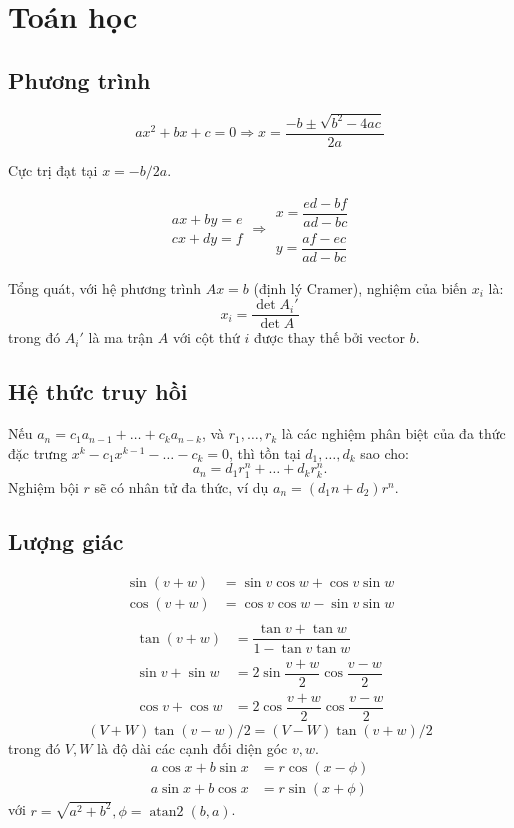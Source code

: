 
\chapter{Toán học}

\section{Phương trình}
\[ax^2+bx+c=0 \Rightarrow x = \frac{-b\pm\sqrt{b^2-4ac}}{2a}\]

Cực trị đạt tại $x = -b/2a$.

\[\begin{aligned}ax+by=e\\cx+dy=f\end{aligned}
\Rightarrow
\begin{aligned}x=\dfrac{ed-bf}{ad-bc}\\y=\dfrac{af-ec}{ad-bc}\end{aligned}\]

Tổng quát, với hệ phương trình $Ax = b$ (định lý Cramer), nghiệm của biến $x_i$ là:
\[x_i = \frac{\det A_i'}{\det A} \]
trong đó $A_i'$ là ma trận $A$ với cột thứ $i$ được thay thế bởi vector $b$.

\section{Hệ thức truy hồi}
Nếu $a_n = c_1 a_{n-1} + \dots + c_k a_{n-k}$, và $r_1, \dots, r_k$ là các nghiệm phân biệt của đa thức đặc trưng $x^k - c_1 x^{k-1} - \dots - c_k = 0$, thì tồn tại $d_1, \dots, d_k$ sao cho:
\[a_n = d_1r_1^n + \dots + d_kr_k^n. \]
Nghiệm bội $r$ sẽ có nhân tử đa thức, ví dụ $a_n = (d_1n + d_2)r^n$.

\section{Lượng giác}
\begin{align*}
\sin(v+w)&{}=\sin v\cos w+\cos v\sin w\\
\cos(v+w)&{}=\cos v\cos w-\sin v\sin w\\
\end{align*}
\begin{align*}
\tan(v+w)&{}=\dfrac{\tan v+\tan w}{1-\tan v\tan w}\\
\sin v+\sin w&{}=2\sin\dfrac{v+w}{2}\cos\dfrac{v-w}{2}\\
\cos v+\cos w&{}=2\cos\dfrac{v+w}{2}\cos\dfrac{v-w}{2}
\end{align*}
\[ (V+W)\tan(v-w)/2{}=(V-W)\tan(v+w)/2 \]
trong đó $V, W$ là độ dài các cạnh đối diện góc $v, w$.
\begin{align*}
	a\cos x+b\sin x&=r\cos(x-\phi)\\
	a\sin x+b\cos x&=r\sin(x+\phi)
\end{align*}
với $r=\sqrt{a^2+b^2}, \phi=\operatorname{atan2}(b,a)$.


